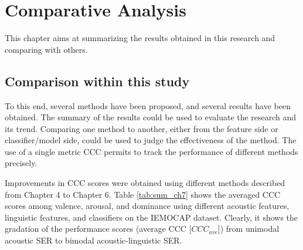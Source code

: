 \chapter{Comparative Analysis}
This chapter aims at summarizing the results obtained in this research and
comparing with others.


\section{Comparison within this study}
To this end, several methods have been proposed, and several results have been
obtained. The summary of the results could be used to evaluate the research and
its trend. Comparing one method to another, either from the feature side or
classifier/model side, could be used to judge the effectiveness of the method.
The use of a single metric CCC permits to track the performance of
different methods precisely.

Improvements in CCC scores were obtained using different methods described from
Chapter 4 to Chapter 6. Table \ref{tab:sum_ch7} shows the averaged CCC scores
among valence, arousal, and dominance using different acoustic features,
linguistic features, and classifiers on the IEMOCAP dataset. Clearly, it shows
the gradation of the performance scores (average CCC [$CCC_{ave}$]) from
unimodal acoustic SER to bimodal acoustic-linguistic SER.

